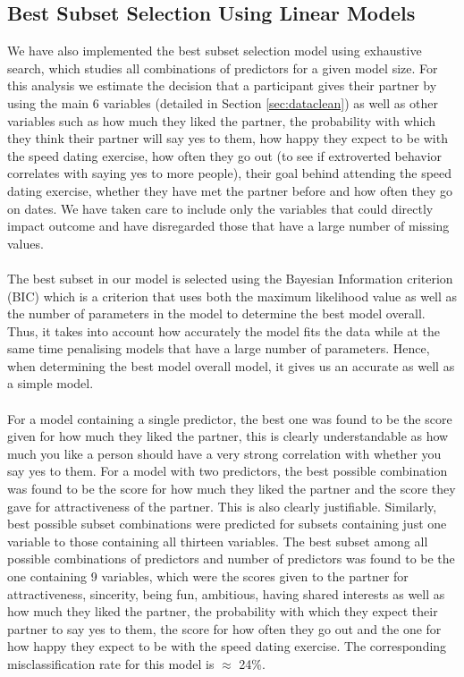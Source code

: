 \documentclass{article}
\begin{document}
\subsection{Best Subset Selection Using Linear Models}
\label{sec:bestsubsetsection}
We have also implemented the best subset selection model using exhaustive search, which studies all combinations of predictors for a given model size.  For this analysis we estimate the decision that a participant gives their partner by using the main 6 variables (detailed in Section \ref{sec:dataclean}) as well as other variables such as how much they liked the partner, the probability with which they think their partner will say yes to them, how happy they expect to be with the speed dating exercise, how often they go out (to see if extroverted behavior correlates with saying yes to more people), their goal behind attending the speed dating exercise, whether they have met the partner before and how often they go on dates. We have taken care to include only the variables that could directly impact outcome and have disregarded those that have a large number of missing values. \\
\null\\
The best subset in our model is selected using the Bayesian Information criterion (BIC) which is a criterion that uses both the maximum likelihood value as well as the number of parameters in the model to determine the best model overall. Thus, it takes into account how accurately the model fits the data while at the same time penalising models that have a large number of parameters. Hence, when determining the best model overall model, it gives us an accurate as well as a simple model.\\
\null\\
For a model containing a single predictor, the best one was found to be the score given for how much they liked the partner, this is clearly understandable as how much you like a person should have a very strong correlation with whether you say yes to them. For a model with two predictors, the best possible combination was found to be the score for how much they liked the partner and the score they gave for attractiveness of the partner. This is also clearly justifiable. Similarly, best possible subset combinations were predicted for subsets containing just one variable to those containing all thirteen variables. The best subset among all possible combinations of predictors and number of predictors was found to be the one containing 9 variables, which were the scores given to the partner for attractiveness, sincerity, being fun, ambitious, having shared interests as well as how much they liked the partner, the probability with which they expect their partner to say yes to them, the score for how often they go out and the one for how happy they expect to be with the speed dating exercise.  The corresponding misclassification rate for this model is $\approx$ 24\%.\\
\end{document}
